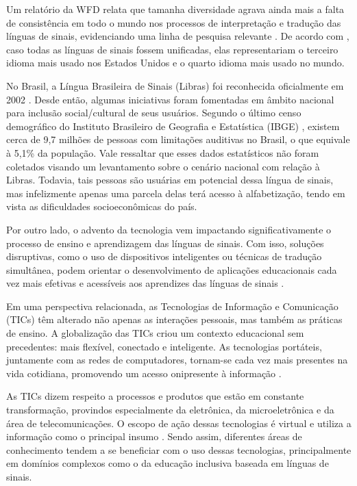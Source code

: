 Um relatório da WFD relata que tamanha diversidade agrava ainda mais a falta de consistência em todo o mundo nos processos de interpretação e tradução das línguas de sinais, evidenciando uma linha de pesquisa relevante \cite{Napier2019}. De acordo com , caso todas as línguas de sinais fossem unificadas, elas representariam o terceiro idioma mais usado nos Estados Unidos e o quarto idioma mais usado no mundo.

No Brasil, a Língua Brasileira de Sinais (Libras) foi reconhecida oficialmente em 2002 \cite{Quadros2019, Honora2017}. Desde então, algumas iniciativas foram fomentadas em âmbito nacional para inclusão social/cultural de seus usuários. Segundo o último censo demográfico do Instituto Brasileiro de Geografia e Estatística (IBGE) \cite{IBGE2010}, existem cerca de 9,7 milhões de pessoas com limitações auditivas no Brasil, o que equivale à 5,1\% da população. Vale ressaltar que esses dados estatísticos não foram coletados visando um levantamento sobre o cenário nacional com relação à Libras. Todavia, tais pessoas são usuárias em potencial dessa língua de sinais, mas infelizmente apenas uma parcela delas terá acesso à alfabetização, tendo em vista as dificuldades socioeconômicas do país.

Por outro lado, o advento da tecnologia vem impactando significativamente o processo de ensino e aprendizagem das línguas de sinais. Com isso, soluções disruptivas, como o uso de dispositivos inteligentes ou técnicas de tradução simultânea, podem orientar o desenvolvimento de aplicações educacionais cada vez mais efetivas e acessíveis aos aprendizes das línguas de sinais \cite{Napier2019}.

Em uma perspectiva relacionada, as Tecnologias de Informação e Comunicação (TICs) têm alterado não apenas as interações pessoais, mas também as práticas de ensino. A globalização das TICs criou um contexto educacional sem precedentes: mais flexível, conectado e inteligente. As tecnologias portáteis, juntamente com as redes de computadores, tornam-se cada vez mais presentes na vida cotidiana, promovendo um acesso onipresente à informação \cite{Cilli2017}.

As TICs dizem respeito a processos e produtos que estão em constante transformação, provindos especialmente da eletrônica, da microeletrônica e da área de telecomunicações. O escopo de ação dessas tecnologias é virtual e utiliza a informação como o principal insumo \cite{Cilli2017}. Sendo assim, diferentes áreas de conhecimento tendem a se beneficiar com o uso dessas tecnologias, principalmente em domínios complexos como o da educação inclusiva baseada em línguas de sinais.

